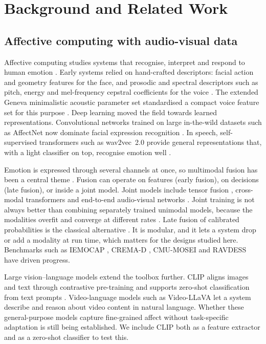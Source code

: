 \section{Background and Related Work}\label{sec:background}

\subsection{Affective computing with audio-visual data}

Affective computing studies systems that recognise, interpret and respond to human emotion \citep{picard1997}. Early systems relied on hand-crafted descriptors: facial action and geometry features for the face, and prosodic and spectral descriptors such as pitch, energy and mel-frequency cepstral coefficients for the voice \citep{schuller2018}. The extended Geneva minimalistic acoustic parameter set standardised a compact voice feature set for this purpose \citep{eyben2016}. Deep learning moved the field towards learned representations. Convolutional networks trained on large in-the-wild datasets such as AffectNet now dominate facial expression recognition \citep{mollahosseini2019,li2022fer}. In speech, self-supervised transformers such as wav2vec~2.0 \citep{baevski2020} provide general representations that, with a light classifier on top, recognise emotion well \citep{pepino2021,wagner2023}.

Emotion is expressed through several channels at once, so multimodal fusion has been a central theme \citep{poria2017,baltrusaitis2019}. Fusion can operate on features (early fusion), on decisions (late fusion), or inside a joint model. Joint models include tensor fusion \citep{zadeh2017}, cross-modal transformers \citep{tsai2019} and end-to-end audio-visual networks \citep{tzirakis2017}. Joint training is not always better than combining separately trained unimodal models, because the modalities overfit and converge at different rates \citep{wang2020}. Late fusion of calibrated probabilities is the classical alternative \citep{kittler1998}. It is modular, and it lets a system drop or add a modality at run time, which matters for the designs studied here. Benchmarks such as IEMOCAP \citep{busso2008}, CREMA-D \citep{cao2014}, CMU-MOSEI \citep{zadeh2018} and RAVDESS \citep{livingstone2018} have driven progress.

Large vision--language models extend the toolbox further. CLIP aligns images and text through contrastive pre-training and supports zero-shot classification from text prompts \citep{radford2021}. Video-language models such as Video-LLaVA \citep{lin2024} let a system describe and reason about video content in natural language. Whether these general-purpose models capture fine-grained affect without task-specific adaptation is still being established. We include CLIP both as a feature extractor and as a zero-shot classifier to test this.

